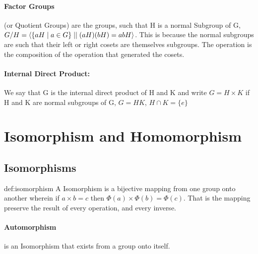 \paragraph{Factor Groups} (or Quotient Groups) are the groups, such that H is a normal Subgroup of G, $G/H = \braket{\{aH\;|\;a \in G\}\;||\;(aH)(bH) = abH}$. This is because the normal subgroups are such that their left or right cosets are themselves subgroups. The operation is the composition of the operation that generated the cosets.
\vspace{5px} \paragraph{Internal Direct Product:} We say that G is the internal direct product of H and K and write $G = H \times K$ if H and K are normal subgroups of G, $G = HK$, $H \cap K = \{e\}$



\section{Isomorphism and Homomorphism}

\subsection{Isomorphisms}

\begin{definition}[Isomorphism]{def:isomorphism}
    A Isomorphism is a bijective mapping from one group onto another wherein if $ a \times b = c $ then $ \Phi(a) \times \Phi(b) = \Phi(c) $. That is the mapping preserve the result of every operation, and every inverse.
\end{definition}

\paragraph{Automorphism} is an Isomorphism that exists from a group onto itself. \\
\vspace{10px}

